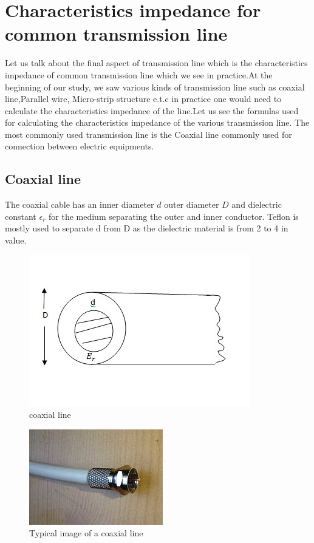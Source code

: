 \section{Characteristics impedance for common transmission line}
Let us talk about the final aspect of transmission line which is the characteristics impedance of common transmission line which we see in practice.At the beginning of our study, we saw various kinds of transmission line such as coaxial line,Parallel wire, Micro-strip structure e.t.c in practice one would need to calculate the characteristics impedance of the line.Let us see the formulas used for calculating the characteristics impedance of the various transmission line. The most commonly used transmission line is the Coaxial line commonly used for connection between  electric equipments.

\subsection{Coaxial line}
The coaxial cable has an inner diameter $d$ outer  diameter $D$ and dielectric constant $\epsilon_r$ for the medium separating the outer and inner conductor. Teflon is mostly used to separate d from D as the dielectric material is from 2 to 4 in value.
\begin{figure}[h]
\centering
\includegraphics[width=1\linewidth]{./graphics/coaxialcable1}
\caption{coaxial line}
\end{figure}
\begin{figure}[h]
\centering
\includegraphics[scale=0.8]{./graphics/coaxialcable}
\caption{Typical image of a coaxial line}
\end{figure}

